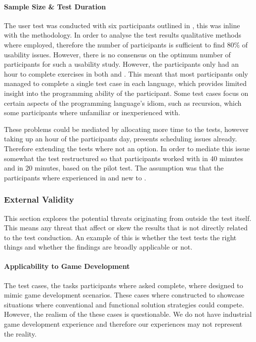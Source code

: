 \paragraph{Sample Size \& Test Duration}
The user test was conducted with six participants outlined in , this was inline with the \champagne methodology. In order to analyse the test results qualitative methods where employed, therefore the number of participants is sufficient to find 80\% of usability issues\cite{virzi1992refining}. However, there is no consensus on the optimum number of participants for such a usability study\cite{hwang2010number}. However, the participants only had an hour to complete exercises in both \fs and \cs. This meant that most participants only managed to complete a single test case in each language, which provides limited insight into the programming ability of the participant. Some test cases focus on certain aspects of the programming language's idiom, such as recursion, which some participants where unfamiliar or inexperienced with.

These problems could be mediated by allocating more time to the tests, however taking up an hour of the participants day, presents scheduling issues already. Therefore extending the tests where not an option. In order to mediate this issue somewhat the test restructured so that participants worked with \fs in 40 minutes and \cs in 20 minutes, based on the pilot test. The assumption was that the participants where experienced in \cs and new to \fs. 


\subsubsection{External Validity}
This section explores the potential threats originating from outside the test itself. This means any threat that affect or skew the results that is not directly related to the test conduction. An example of this is whether the test tests the right things and whether the findings are broadly applicable or not.

\paragraph{Applicability to Game Development}
The test cases, the tasks participants where asked complete, where designed to mimic game development scenarios. These cases where constructed to showcase situations where conventional and functional solution strategies could compete. However, the realism of the these cases is questionable. We do not have industrial game development experience and therefore our experiences may not represent the reality.

